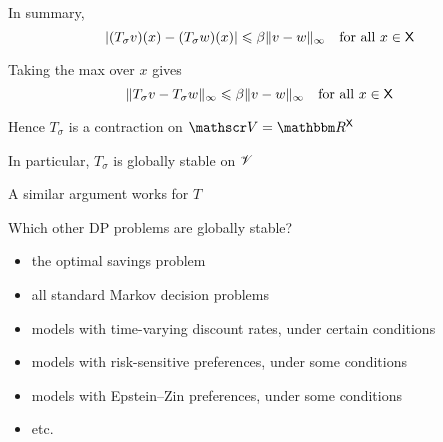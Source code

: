 \begin{frame}

    In summary,
    \begin{equation*}
        |(T_\sigma v)(x) -(T_\sigma w)(x)|
        \leqslant \beta \| v - w\|_\infty
        \quad \text{for all } x \in \mathsf X
    \end{equation*}
    
        \vspace{0.5em}
    Taking the max over $x$ gives
    \begin{equation*}
        \|T_\sigma v -T_\sigma w \|_\infty
        \leqslant \beta \| v - w\|_\infty
        \quad \text{for all } x \in \mathsf X
    \end{equation*}


        \vspace{0.5em}
    Hence $T_\sigma$ is a contraction on $\vV = \RR^\Xsf$

        \vspace{0.5em}
    In particular, $T_\sigma$ is globally stable on $\mathscr V$

        \vspace{0.5em}
        \vspace{0.5em}
    A similar argument works for $T$

\end{frame}


\begin{frame}

    Which other DP problems are globally stable?

        \vspace{0.5em}
    \begin{itemize}
        \item the optimal savings problem
            \vspace{0.5em}
        \item all standard Markov decision problems
            \vspace{0.5em}
        \item models with time-varying discount rates, under certain
            conditions
            \vspace{0.5em}
        \item models with risk-sensitive preferences, under some conditions
            \vspace{0.5em}
        \item models with Epstein--Zin preferences, under some conditions
            \vspace{0.5em}
        \item etc.
    \end{itemize}
    

\end{frame}



